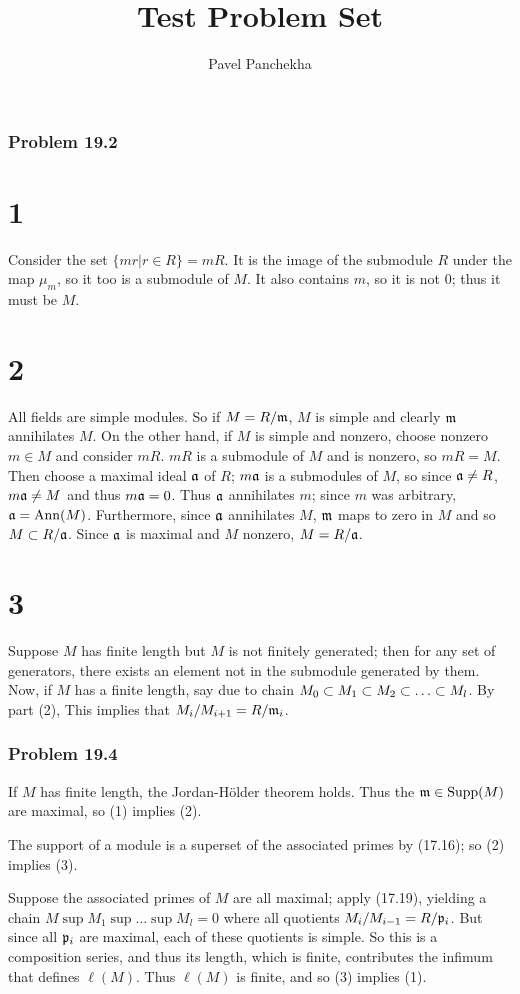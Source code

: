 \documentclass{pset}
\title{Test Problem Set}
\author{Pavel Panchekha}
\begin{document}
\section{Problem 19.2}
\label{sec-1}


\part{1} Consider the set $\{ m r | r \in R \} = m R$.  It is the image
of the submodule $R$ under the map $\mu_m$, so it too is a submodule of
$M$.  It also contains $m$, so it is not $0$; thus it must be $M$.

\part{2} All fields are simple modules.  So if $M = R / \mathfrak{m}$, $M$ is
simple and clearly $\mathfrak{m}$ annihilates $M$.  On the other hand, if $M$
is simple and nonzero, choose nonzero $m \in M$ and consider $m R$.
$m R$ is a submodule of $M$ and is nonzero, so $m R = M$.  Then choose
a maximal ideal $\mathfrak{a}$ of $R$; $m \mathfrak{a}$ is a submodules of $M$, so since
$\mathfrak{a} \ne R$, $m \mathfrak{a} \ne M$ and thus $m \mathfrak{a} = 0$.  Thus $\mathfrak{a}$
annihilates $m$; since $m$ was arbitrary, $\mathfrak{a} = \operatorname{Ann}(M)$.
Furthermore, since $\mathfrak{a}$ annihilates $M$, $\mathfrak{m}$ maps to zero in $M$
and so $M \subset R / \mathfrak{a}$.  Since $\mathfrak{a}$ is maximal and $M$ nonzero, $M =
R / \mathfrak{a}$.

\part{3} Suppose $M$ has finite length but $M$ is not finitely
generated; then for any set of generators, there exists an element not
in the submodule generated by them.  Now, if $M$ has a finite length,
say due to chain $M_0 \sub M_1 \sub M_2 \sub \dots \sub M_l$.  By part (2), This implies
that $M_i / M_{i+1} = R / \mathfrak{m}_i$.
\section{Problem 19.4}
\label{sec-2}


If $M$ has finite length, the Jordan-H\"older theorem holds.  Thus the
$\mathfrak{m} \in \operatorname{Supp}(M)$ are maximal, so (1) implies (2).

The support of a module is a superset of the associated primes by
(17.16); so (2) implies (3).

Suppose the associated primes of $M$ are all maximal; apply (17.19),
yielding a chain $M \sup M_1 \sup \dots \sup M_l = 0$ where all quotients $M_i / M_{i-1}
= R / \mathfrak{p}_i$.  But since all $\mathfrak{p}_i$ are maximal, each of these quotients
is simple.  So this is a composition series, and thus its length,
which is finite, contributes the infimum that defines $\ell(M)$.  Thus
$\ell(M)$ is finite, and so (3) implies (1).
\end{document}
